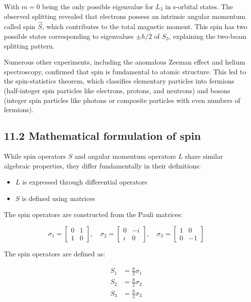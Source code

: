 \documentclass[10pt]{article}
\begin{document}
With $m=0$ being the only possible eigenvalue for $L_3$ in s-orbital states. The observed splitting revealed that electrons possess an intrinsic angular momentum called spin $\vec{S}$, which contributes to the total magnetic moment. This spin has two possible states corresponding to eigenvalues $\pm\hbar/2$ of $S_3$, explaining the two-beam splitting pattern.

Numerous other experiments, including the anomalous Zeeman effect and helium spectroscopy, confirmed that spin is fundamental to atomic structure. This led to the spin-statistics theorem, which classifies elementary particles into fermions (half-integer spin particles like electrons, protons, and neutrons) and bosons (integer spin particles like photons or composite particles with even numbers of fermions).

\subsection*{11.2 Mathematical formulation of spin}
While spin operators $S$ and angular momentum operators $L$ share similar algebraic properties, they differ fundamentally in their definitions:

\begin{itemize}
  \item $L$ is expressed through differential operators
  \item $S$ is defined using matrices
\end{itemize}

The spin operators are constructed from the Pauli matrices:

\[
\sigma_{1}=\left[\begin{array}{ll}
0 & 1  \tag{11.4}\\
1 & 0
\end{array}\right], \quad \sigma_{2}=\left[\begin{array}{cc}
0 & -i \\
i & 0
\end{array}\right], \quad \sigma_{3}=\left[\begin{array}{cc}
1 & 0 \\
0 & -1
\end{array}\right]
\]

The spin operators are defined as:

\begin{align*}
S_{1} & =\frac{\hbar}{2} \sigma_{1} \\
S_{2} & =\frac{\hbar}{2} \sigma_{2}  \tag{11.5}\\
S_{3} & =\frac{\hbar}{2} \sigma_{3}
\end{align*}
\end{document}
